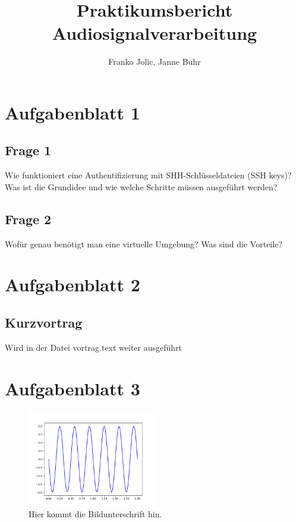 \documentclass[a4paper, 11pt]{article}
\title{Praktikumsbericht Audiosignalverarbeitung}
\author{Franko Jolic, Janne Buhr}
\begin{document}
\begin{titlepage}
    \maketitle
    \tableofcontents
    \vfill
\end{titlepage}

\section{Aufgabenblatt 1}

    \subsection{Frage 1}
    Wie funktioniert eine Authentifizierung mit SHH-Schlüsseldateien (SSH keys)? Was ist die Grundidee und wie welche Schritte müssen ausgeführt werden?

    \subsection{Frage 2}
    Wofür genau benötigt man eine virtuelle Umgebung? Was sind die Vorteile?

\section{Aufgabenblatt 2}

    \subsection{Kurzvortrag}
    Wird in der Datei vortrag.text weiter ausgeführt

\section{Aufgabenblatt 3}

    
    
    \begin{figure}
    \includegraphics[width =0.5\textwidth]{plot.png}
    \caption{Hier kommt die Bildunterschrift hin.}
    \label{fig : label1}
    \end{figure}
\end{document}
